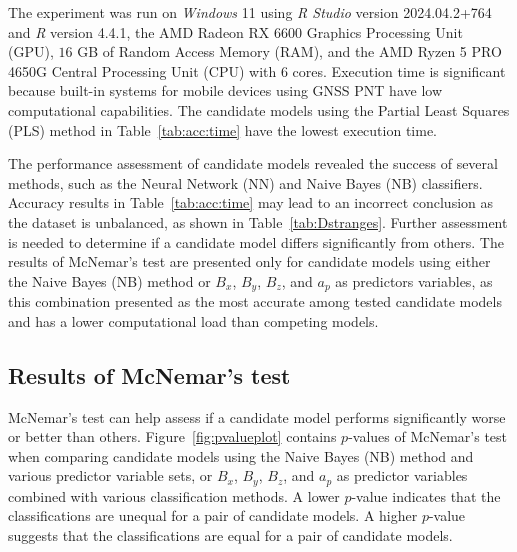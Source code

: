 \let\LaTeXcline\cline\documentclass[sn-mathphys-num]{sn-jnl}\let\cline\LaTeXcline
\begin{document}
The experiment was run on \textit{Windows} 11 using \textit{R Studio} version 2024.04.2+764 and \textit{R} version 4.4.1, the AMD Radeon RX 6600 Graphics Processing Unit (GPU), $16$ GB of Random Access Memory (RAM), and the AMD Ryzen 5 PRO 4650G Central Processing Unit (CPU) with $6$ cores. Execution time is significant because built-in systems for mobile devices using GNSS PNT have low computational capabilities. The candidate models using the Partial Least Squares (PLS) method in Table~\ref{tab:acc:time} have the lowest execution time.

The performance assessment of candidate models revealed the success of several methods, such as the Neural Network (NN) and Naive Bayes (NB) classifiers. Accuracy results in Table~\ref{tab:acc:time} may lead to an incorrect conclusion as the dataset is unbalanced, as shown in Table~\ref{tab:Dstranges}. Further assessment is needed to determine if a candidate model differs significantly from others. The results of
McNemar’s test are presented only for candidate models using either the Naive Bayes (NB) method or $B_{x}$, $B_{y}$, $B_{z}$, and $a_{p}$ as predictors variables, as this combination presented as the most accurate among tested candidate models and has a lower computational load than competing models.

\subsection{Results of McNemar's test}

McNemar’s test can help assess if a candidate model performs significantly worse or better than others. Figure~\ref{fig:pvalueplot} contains $p$-values of McNemar's test when comparing candidate models using the Naive Bayes (NB) method and various predictor variable sets, or $B_{x}$, $B_{y}$, $B_{z}$, and $a_{p}$ as predictor variables combined with various classification methods. A lower $p$-value indicates that the classifications are unequal for a pair of candidate models. A higher $p$-value suggests that the classifications are equal for a pair of candidate models.
\end{document}
